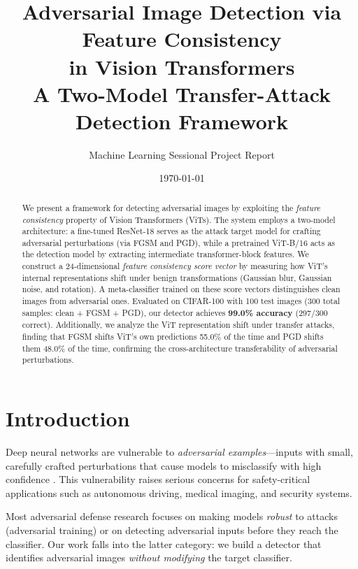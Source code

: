 \documentclass[12pt, a4paper]{article}
\title{%
    \textbf{Adversarial Image Detection via Feature Consistency\\
    in Vision Transformers}\\[0.5em]
    \large A Two-Model Transfer-Attack Detection Framework
}
\author{
    Machine Learning Sessional Project Report
}
\date{\today}
\begin{document}
\maketitle

\begin{abstract}
    We present a framework for detecting adversarial images by exploiting
    the \emph{feature consistency} property of Vision Transformers (ViTs).
    The system employs a two-model architecture: a fine-tuned ResNet-18
    serves as the attack target model for crafting adversarial perturbations
    (via FGSM and PGD), while a pretrained ViT-B/16 acts as the detection
    model by extracting intermediate transformer-block features. We
    construct a 24-dimensional \emph{feature consistency score vector} by
    measuring how ViT's internal representations shift under benign
    transformations (Gaussian blur, Gaussian noise, and rotation). A
    meta-classifier trained on these score vectors distinguishes clean
    images from adversarial ones. Evaluated on CIFAR-100 with 100 test
    images (300 total samples: clean + FGSM + PGD), our detector achieves
    \textbf{99.0\% accuracy} (297/300 correct). Additionally, we analyze
    the ViT representation shift under transfer attacks, finding that FGSM
    shifts ViT's own predictions 55.0\% of the time and PGD shifts them
    48.0\% of the time, confirming the cross-architecture transferability
    of adversarial perturbations.
\end{abstract}

\tableofcontents
\newpage

\section{Introduction}

Deep neural networks are vulnerable to \emph{adversarial examples}---inputs
with small, carefully crafted perturbations that cause models to
misclassify with high confidence \cite{goodfellow2015explaining,
madry2018towards}. This vulnerability raises serious concerns for
safety-critical applications such as autonomous driving, medical imaging,
and security systems.

Most adversarial defense research focuses on making models \emph{robust}
to attacks (adversarial training) or on detecting adversarial inputs
before they reach the classifier. Our work falls into the latter
category: we build a detector that identifies adversarial images
\emph{without modifying} the target classifier.
\end{document}
